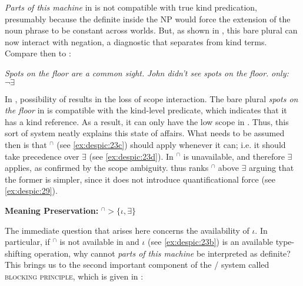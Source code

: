 \documentclass[output=paper,
modfonts
]{langscibook}
\begin{document}
	\ea \label{ex:despic:27}
	\z 
	\sn\citep[419]{Dayal2004}
	\z 
	
	\textit{Parts of this machine} in  is not compatible with true kind predication, presumably because the definite inside the NP would force the extension of the noun phrase to be constant across worlds. But, as shown in , this bare plural can now interact with negation, a diagnostic that separates  from kind terms. Compare then  to :
	
	\ea \label{ex:despic:28} 
	\ea \label{ex:despic:28a} 
	\textit{Spots on the floor are a common sight.}
	\ex \label{ex:despic:28b} 
	\textit{John didn't see spots on the floor.} \hfill\textit{only:} $\neg\exists$\hspace{75pt}
	\z 
	\z 
	
	In , possibility of  results in the loss of scope interaction. The bare plural \textit{spots on the floor} in  is compatible with the kind-level predicate, which indicates that it has a kind reference. As a result, it can only have the low scope in . Thus, this sort of
	system neatly explains this state of affairs. What needs to be assumed then is that $^\cap$ (see \ref{ex:despic:23c}) should apply whenever it can; i.e. it should take precedence over $\exists$ (see \ref{ex:despic:23d}). In  $^\cap$ is unavailable, and therefore $\exists$ applies, as confirmed by the scope ambiguity. \citet{Chierchia1998} thus ranks $^\cap$ above $\exists$ arguing that the former is simpler, since it does not introduce quantificational force (see \ref{ex:despic:29}).
	
	\ea \label{ex:despic:29}
	\textbf{Meaning Preservation:} $^\cap>\{\iota,\exists\}$ \citep[419]{Dayal2004}
	\z 
	
	The immediate question that arises here concerns the availability of $\iota$. In particular, if $^\cap$ is not available in  and $\iota$ (see \ref{ex:despic:23b}) is an available type-shifting operation, why cannot \textit{parts of this machine} be interpreted as definite? This brings us to the second important component of the \citet{Chierchia1998}/\citet{Dayal2004} system called \textsc{blocking principle}, which is given in : 
	
\end{document}
